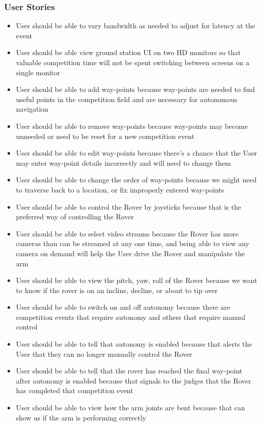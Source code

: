 \documentclass[onecolumn, draftclsnofoot, 10pt, compsoc]{IEEEtran}
\begin{document}
\subsubsection{User Stories}
\begin{itemize}
\item User should be able to vary bandwidth as needed to adjust for latency at the event
\item User should be able view ground station UI on two HD monitors so that valuable competition time will not be spent switching between screens on a single monitor
\item User should be able to add way-points because way-points are needed to find useful points in the competition field and are necessary for autonomous navigation
\item User should be able to remove way-points because way-points may become unneeded or need to be reset for a new competition event
\item User should be able to edit way-points because there's a chance that the User may enter way-point details incorrectly and will need to change them
\item User should be able to change the order of way-points because we might need to traverse back to a location, or fix improperly entered way-points
\item User should be able to control the Rover by joysticks because that is the preferred way of controlling the Rover  
\item User should be able to select video streams because the Rover has more cameras than can be streamed at any one time, and being able to view any camera on demand will help the User drive the Rover and manipulate the arm
\item User should be able to view the pitch, yaw, roll of the Rover because we want to know if the rover is on an incline, decline, or about to tip over
\item User should be able to switch on and off autonomy because there are competition events that require autonomy and others that require manual control
\item User should be able to tell that autonomy is enabled because that alerts the User that they can no longer manually control the Rover
\item User should be able to tell that the rover has reached the final way-point after autonomy is enabled because that signals to the judges that the Rover has completed that competition event
\item User should be able to view how the arm joints are bent because that can show us if the arm is performing correctly

\end{itemize}
\end{document}
